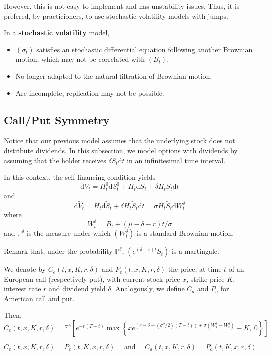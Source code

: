 However, this is not easy to implement and has unstability issues. Thus, it is prefered, by practicioners, to use stochastic volatility models with jumps.

In a \textbf{stochastic volatility} model,
\begin{itemize}
    \item $(\sigma_t)$ satisfies an stochastic differential equation following another Brownian motion, which may not be correlated with $(B_t)$.
    \item No longer adapted to the natural filtration of Brownian motion. 
    \item Are incomplete, replication may not be possible. 
\end{itemize}

\subsection{Call/Put Symmetry}

Notice that our previous model assumes that the underlying stock does not distribute dividends. In this subsection, we model options with dividends by assuming that the holder receives $\delta S_t \mathrm{d}t$ in an infinitesimal time interval.

In this context, the self-financing condition yields 
\[
    \mathrm{d}V_t = H_t^0 \mathrm{d}S_t^0 + H_t \mathrm{d} S_t + \delta H_t S_t \mathrm{d} t 
\]
and 
\[
    \mathrm{d} \tilde{V}_t = H_t \mathrm{d}\tilde{S}_t + \delta H_t \tilde{S}_t \mathrm{d}t = \sigma H_t \tilde{S}_t \mathrm{d}W_t^\delta
\]
where
\[
    W_t^\delta = B_t + (\mu - \delta - r)t/\sigma 
\]
and $\mathbb{P}^\delta$ is the measure under which $(W_t^\delta)$ is a standard Brownian motion. 

Remark that, under the probability $\mathbb{P}^\delta$, $(e^{(\delta-r)t} S_t)$ is a martingale.

We denote by $C_e(t, x, K, r, \delta)$ and $P_e(t, x, K, r, \delta)$ the price, at time $t$ of an European call (respectively put), with current stock price $x$, strike price $K$, interest rate $r$ and dividend yield $\delta$. Analogously, we define $C_a$ and $P_a$ for American call and put. 
 
Then, 
\[
    C_e(t, x, K, r, \delta) = \mathbb{E}^\delta \left[ e^{-r(T-t)} \max \left\{xe^{(r-\delta-(\sigma^2/2)(T-t)) + \sigma(W_T^\delta - W_t^\delta)} - K, ~0 \right\} \right]
\]

\begin{proposition}
    \[
        C_e(t, x, K, r, \delta) = P_e(t, K, x, r, \delta) \quad \text{ and } \quad C_a(t, x, K, r, \delta) = P_a(t, K, x, r, \delta)
    \]
\end{proposition}

